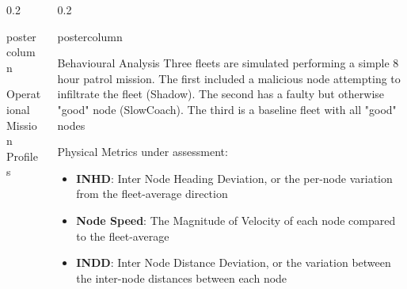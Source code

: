 \documentclass[final,hyperref={pdfpagelabels=false}]{beamer}
\def\colwidth{0.2\linewidth}
\begin{document}
\begin{frame}[fragile]
\begin{columns}[T]
\begin{column}{\colwidth}
\begin{beamercolorbox}[center,wd=\textwidth]{postercolumn}
\begin{minipage}[T]{.98\textwidth}
{\begin{block}{Operational Mission Profiles}
						\end{block}
												
												
					}
				\end{minipage}
			\end{beamercolorbox}
		\end{column}
				
		\begin{column}{\colwidth}
			\begin{beamercolorbox}[center,wd=\textwidth]{postercolumn}
				\begin{minipage}[T]{.98\textwidth} %
					\parbox[t]{\textwidth}{ %
						\begin{block}{Behavioural Analysis}
							Three fleets are simulated performing a simple 8 hour patrol mission. The first included a malicious node attempting to infiltrate the fleet (Shadow). The second has a faulty but otherwise "good" node (SlowCoach). The third is a baseline fleet with all "good" nodes
														
							\vspace{0.25\baselineskip}
														
							Physical Metrics under assessment:
							\begin{itemize}
								\item \textbf{INHD}: Inter Node Heading Deviation, or the per-node variation from the fleet-average direction
								\item \textbf{Node Speed}: The Magnitude of Velocity of each node compared to the fleet-average
								\item \textbf{INDD}: Inter Node Distance Deviation, or the variation between the inter-node distances between each node
							\end{itemize}
														

\end{block}}
\end{minipage}
\end{beamercolorbox}
\end{column}
\end{columns}
\end{frame}
\end{document}
